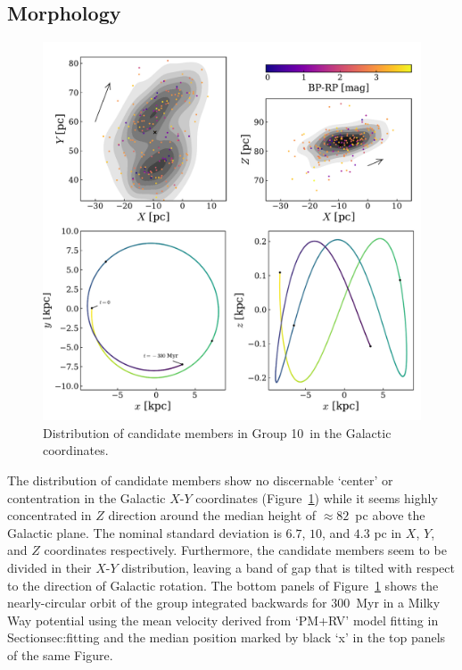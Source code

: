 \documentclass[modern,letterpaper]{aastex61}
\newcommand{\sectionname}{Section}
\newcommand{\figname}{Figure}
\newcommand{\groupTen}{Group 10}
\begin{document}
\subsection{Morphology}

\begin{figure}
  \includegraphics[width=0.95\linewidth]{orbit_morphology.pdf}
  \caption{Distribution of candidate members in \groupTen\ in
    the Galactic coordinates.}
  \label{fig:orbit_morphology}
\end{figure}

The distribution of candidate members show no discernable `center' or
contentration in the Galactic $X$-$Y$ coordinates
(Figure~\ref{fig:orbit_morphology}) while it seems highly concentrated in $Z$
direction around the median height of $\approx 82$~pc above the Galactic plane.
The nominal standard deviation is $6.7$, $10$, and $4.3$ pc in $X$, $Y$, and $Z$
coordinates respectively.
Furthermore, the candidate members seem to be divided in their $X$-$Y$
distribution, leaving a band of gap that is tilted with respect to the direction
of Galactic rotation.
The bottom panels of \figname~\ref{fig:orbit_morphology} shows the
nearly-circular orbit of the group integrated backwards for $300$~Myr in a Milky
Way potential \citep{2015ApJS..216...29B} using the mean velocity derived from
`PM+RV' model fitting in \sectionname{sec:fitting} and the median position
marked by black `x' in  the top panels of the same \figname.
\end{document}
